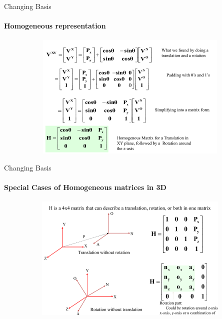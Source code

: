 \documentclass[aspectratio=169,notes]{beamer}
\begin{document}
\begin{frame}[t]{Changing Basis}
    \framesubtitle{Homogeneous representation}
    \vspace{-0.6cm}
        \begin{figure}[H]
            \centering\includegraphics[height=6cm,width=1\textwidth,keepaspectratio]{change_klimchik_2.png}
            \label{fig:change_klimchik_2.png}
        \end{figure}
    \end{frame}

    \begin{frame}[t]{Changing Basis}
        \framesubtitle{Special Cases of Homogeneous matrices in 3D}
        \vspace{-0.6cm}
            \begin{figure}[H]
                \centering\includegraphics[height=6cm,width=1\textwidth,keepaspectratio]{change_klimchik_3.png}
                \label{fig:change_klimchik_3.png}
            \end{figure}
        \end{frame}
    
\end{document}
